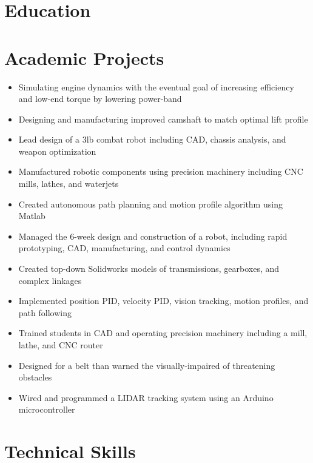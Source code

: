 \documentclass{resume}
\begin{document}
\section{Education}\section{Academic Projects}\begin{itemize}
\item Simulating engine dynamics with the eventual goal of increasing efficiency and low-end torque by lowering power-band
\item Designing and manufacturing improved camshaft to match optimal lift profile\end{itemize}\begin{itemize}
\item Lead design of a 3lb combat robot including CAD, chassis analysis, and weapon optimization
\item Manufactured robotic components using precision machinery including CNC mills, lathes, and waterjets
\item Created autonomous path planning and motion profile algorithm using Matlab\end{itemize}\begin{itemize}
\item Managed the 6-week design and construction of a robot, including rapid prototyping, CAD, manufacturing, and control dynamics
\item Created top-down Solidworks models of transmissions, gearboxes, and complex linkages
\item Implemented position PID, velocity PID, vision tracking, motion profiles, and path following
\item Trained students in CAD and operating precision machinery including a mill, lathe, and CNC router\end{itemize}\begin{itemize}
\item Designed for a belt than warned the visually-impaired of threatening obstacles
\item Wired and programmed a LIDAR tracking system using an Arduino microcontroller\end{itemize}\section{Technical Skills}
\end{document}
